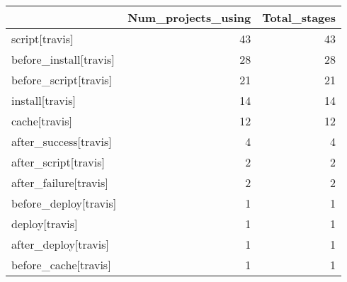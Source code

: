 \begin{tabular}{lrr}
\toprule
{} &  Num\_projects\_using &  Total\_stages \\
\midrule
script[travis]         &                  43 &            43 \\
before\_install[travis] &                  28 &            28 \\
before\_script[travis]  &                  21 &            21 \\
install[travis]        &                  14 &            14 \\
cache[travis]          &                  12 &            12 \\
after\_success[travis]  &                   4 &             4 \\
after\_script[travis]   &                   2 &             2 \\
after\_failure[travis]  &                   2 &             2 \\
before\_deploy[travis]  &                   1 &             1 \\
deploy[travis]         &                   1 &             1 \\
after\_deploy[travis]   &                   1 &             1 \\
before\_cache[travis]   &                   1 &             1 \\
\bottomrule
\end{tabular}
